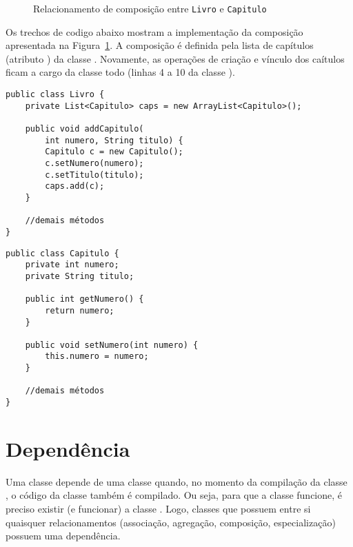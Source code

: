 \begin{figure}[h]
	\centering
	
	
	\caption{Relacionamento de composição entre \texttt{Livro} e \texttt{Capitulo}}
	\label{fig:composicao-livro-capitulo}
\end{figure}

Os trechos de codigo abaixo mostram a implementação da composição apresentada na Figura~\ref{fig:composicao-livro-capitulo}. A composição é definida pela lista de capítulos (atributo ) da classe . Novamente, as operações de criação e vínculo dos caítulos ficam a cargo da classe todo (linhas 4 a 10 da classe ).
 
\begin{verbatim}
public class Livro {
	private List<Capitulo> caps = new ArrayList<Capitulo>();

	public void addCapitulo(
		int numero, String titulo) {
		Capitulo c = new Capitulo();
		c.setNumero(numero);
		c.setTitulo(titulo);
		caps.add(c);
	}
	
	//demais métodos
}
\end{verbatim}
 
\begin{verbatim}
public class Capitulo {
	private int numero;
	private String titulo;

	public int getNumero() {
		return numero;
	}
	
	public void setNumero(int numero) {
		this.numero = numero;
	}
	
	//demais métodos
}
\end{verbatim}
 
\section{Dependência}

Uma classe  depende de uma classe  quando, no momento da compilação da classe , o código da classe  também é compilado. Ou seja, para que a classe  funcione, é preciso existir (e funcionar) a classe . Logo, classes que possuem entre si quaisquer relacionamentos (associação, agregação, composição, especialização) possuem uma dependência.

